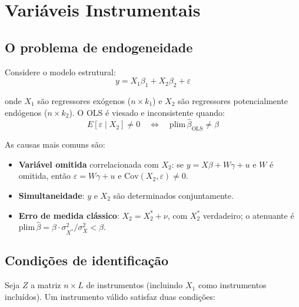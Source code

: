 \chapter{Variáveis Instrumentais}
\label{cap:iv}

\section{O problema de endogeneidade}

Considere o modelo estrutural:
\[
  y = X_1\beta_1 + X_2\beta_2 + \varepsilon
\]

onde $X_1$ são regressores exógenos ($n \times k_1$) e $X_2$ são regressores
potencialmente endógenos ($n \times k_2$). O OLS é viesado e inconsistente
quando:
\[
  E[\varepsilon \mid X_2] \neq 0
  \quad\Longleftrightarrow\quad
  \mathrm{plim}\,\hat{\beta}_{\mathrm{OLS}} \neq \beta
\]

As causas mais comuns são:

\begin{itemize}
  \item \textbf{Variável omitida} correlacionada com $X_2$: se $y = X\beta + W\gamma + u$
        e $W$ é omitida, então $\varepsilon = W\gamma + u$ e $\mathrm{Cov}(X_2, \varepsilon) \neq 0$.
  \item \textbf{Simultaneidade}: $y$ e $X_2$ são determinados conjuntamente.
  \item \textbf{Erro de medida clássico}: $X_2 = X_2^* + \nu$, com $X_2^*$
        verdadeiro; o atenuante é $\mathrm{plim}\,\hat{\beta} = \beta \cdot \sigma_{X^*}^2/\sigma_X^2 < \beta$.
\end{itemize}

\section{Condições de identificação}

Seja $Z$ a matriz $n \times L$ de instrumentos (incluindo $X_1$ como
instrumentos incluídos). Um instrumento válido satisfaz duas condições:

